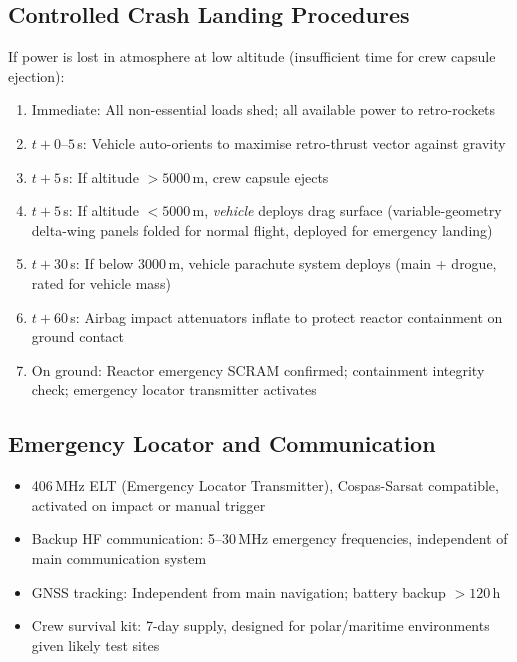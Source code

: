 \documentclass[11pt,a4paper]{article}
\begin{document}
\subsection{Controlled Crash Landing Procedures}

If power is lost in atmosphere at low altitude (insufficient time
for crew capsule ejection):

\begin{enumerate}
  \item Immediate: All non-essential loads shed; all available power
    to retro-rockets
  \item $t + 0$--$5$\,s: Vehicle auto-orients to maximise retro-thrust
    vector against gravity
  \item $t + 5$\,s: If altitude $> 5000$\,m, crew capsule ejects
  \item $t + 5$\,s: If altitude $< 5000$\,m, \textit{vehicle} deploys
    drag surface (variable-geometry delta-wing panels folded for normal
    flight, deployed for emergency landing)
  \item $t + 30$\,s: If below $3000$\,m, vehicle parachute system deploys
    (main + drogue, rated for vehicle mass)
  \item $t + 60$\,s: Airbag impact attenuators inflate to protect reactor
    containment on ground contact
  \item On ground: Reactor emergency SCRAM confirmed; containment
    integrity check; emergency locator transmitter activates
\end{enumerate}

\subsection{Emergency Locator and Communication}

\begin{itemize}
  \item 406\,MHz ELT (Emergency Locator Transmitter), Cospas-Sarsat
    compatible, activated on impact or manual trigger
  \item Backup HF communication: 5--30\,MHz emergency frequencies,
    independent of main communication system
  \item GNSS tracking: Independent from main navigation; battery backup
    $> 120$\,h
  \item Crew survival kit: 7-day supply, designed for polar/maritime
    environments given likely test sites
\end{itemize}
\end{document}
